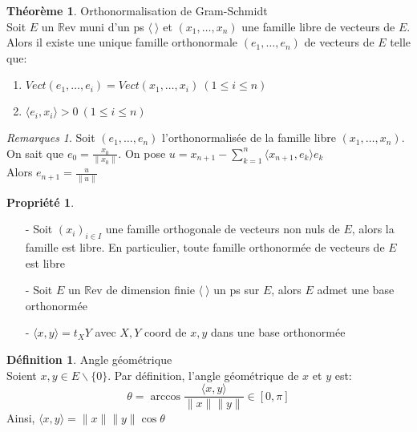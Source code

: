 \documentclass[fleqn]{article}
\theoremstyle{definition} \newtheorem*{defi}{D\'efinition}
\theoremstyle{definition} \newtheorem*{theo}{Th\'eor\`eme}
\theoremstyle{definition} \newtheorem*{coro}{Corollaire}
\theoremstyle{remark} \newtheorem*{rqs}{Remarques}
\theoremstyle{definition} \newtheorem*{prop}{Propri\'et\'e}
\begin{document}
\begin{theo} Orthonormalisation de Gram-Schmidt \\
	Soit $E$ un $\mathbb{R}$ev muni d'un ps $\langle\ \rangle$ et $(x_1, \hdots, x_n)$ une famille libre de vecteurs de $E$. Alors il existe une unique
	famille orthonormale $(e_1, \hdots, e_n)$ de vecteurs de $E$ telle que:
	\begin{enumerate}
		\item $Vect(e_1, \hdots, e_i) = Vect(x_1, \hdots, x_i)\ (1 \leq i \leq n)$
		\item $\langle e_i,x_i \rangle > 0\ (1 \leq i \leq n)$
	\end{enumerate}

	\begin{rqs} Soit $(e_1, \hdots, e_n)$ l'orthonormalis\'ee de la famille libre $(x_1, \hdots, x_n)$. On sait que $e_0 = \frac{x_0}{\|x_0\|}.$
		On pose $u = x_{n+1} - \sum_{k=1}^n \langle x_{n+1},e_k \rangle e_k$\\
		Alors $e_{n+1} = \frac{u}{\|u\|}$

	\end{rqs}
\end{theo}

\begin{prop} $ $
	\begin{enumerate}
		\item [-] Soit $(x_i)_{i\in I}$ une famille orthogonale de vecteurs non nuls de $E$, alors la famille est libre. En particulier, toute
			famille orthonorm\'ee de vecteurs de $E$ est libre
		\item [-] Soit $E$ un $\mathbb{R}$ev de dimension finie  $\langle\ \rangle$ un ps sur $E$, alors $E$ admet une base orthonorm\'ee
		\item [-] $\langle x,y \rangle = t_X Y$ avec $X,Y$ coord de $x,y$ dans une base orthonorm\'ee
	\end{enumerate}
\end{prop}

\begin{defi} Angle g\'eom\'etrique \\
	Soient $x,y \in E\backslash \{0\}$. Par d\'efinition, l'angle g\'eom\'etrique de $x$ et $y$ est:
	\[\theta = \arccos \frac{\langle x,y \rangle}{\|x\| \|y\|} \in [0, \pi]\]
	Ainsi, $\langle x,y \rangle = \|x\| \|y\| \cos \theta$
\end{defi}

\end{document}
